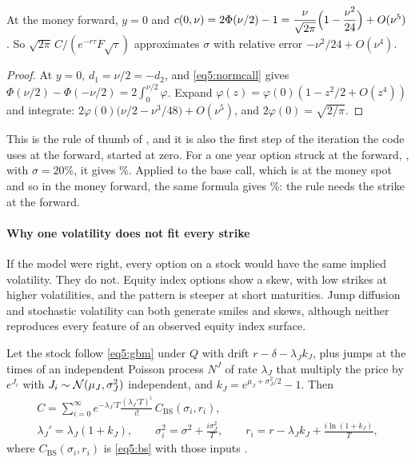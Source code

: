\begin{chapterrefs}
\begin{proposition}\label{prop5:bsapprox}
At the money forward, $y=0$ and $c(0,\nu)=2\Phi(\nu/2)-1=\dfrac{\nu}{\sqrt{2\pi}}\Bigl(1-\dfrac{\nu^2}{24}\Bigr)+O(\nu^5)$.
So $\sqrt{2\pi}\,C/(e^{-r\tau}F\sqrt\tau)$ approximates $\sigma$ with relative error $-\nu^2/24+O(\nu^4)$.
\end{proposition}

\begin{proof}
At $y=0$, $d_1=\nu/2=-d_2$, and \cref{eq5:normcall} gives $\Phi(\nu/2)-\Phi(-\nu/2)=2\int_0^{\nu/2}\varphi$. Expand
$\varphi(z)=\varphi(0)(1-z^2/2+O(z^4))$ and integrate: $2\varphi(0)\bigl(\nu/2-\nu^3/48\bigr)+O(\nu^5)$, and
$2\varphi(0)=\sqrt{2/\pi}$.
\end{proof}

This is the rule of thumb of \textcite{brenner1988}, and it is also the first step of the iteration the code uses at the forward, started at
zero.
For a one year option struck at the forward, \bsApproxStrike, with $\sigma=20\%$, it gives \bsApprox\%.
Applied to the base call, which is at the money spot and so in the money forward, the same formula
gives \bsApproxSpot\%: the rule needs the strike at the forward.

\paragraph{Why one volatility does not fit every strike}
If the model were right, every option on a stock would have the same implied volatility. They do not.
Equity index options show a skew, with low strikes at higher volatilities, and the pattern is
steeper at short maturities. Jump diffusion and stochastic volatility can both generate smiles and
skews, although neither reproduces every feature of an observed equity index surface.

\begin{proposition}\label{prop5:merton}
Let the stock follow \cref{eq5:gbm} under $Q$ with drift $r-\delta-\lambda_Jk_J$, plus jumps at the times of an
independent Poisson process $N^J$ of rate $\lambda_J$ that multiply the price by $e^{J_i}$ with
$J_i\sim\mathcal{N}(\mu_J,\sigma_J^2)$ independent, and $k_J=e^{\mu_J+\sigma_J^2/2}-1$. Then
\begin{equation*}
\begin{gathered}
  C=\sum_{i=0}^\infty e^{-\lambda_J'T}\frac{(\lambda_J'T)^i}{i!}\,C_{\mathrm{BS}}(\sigma_i,r_i),\\
  \lambda_J'=\lambda_J(1+k_J),\qquad\sigma_i^2=\sigma^2+\frac{i\sigma_J^2}T,\qquad r_i=r-\lambda_Jk_J+\frac{i\ln(1+k_J)}T,
\end{gathered}
\end{equation*}
where $C_{\mathrm{BS}}(\sigma_i,r_i)$ is \cref{eq5:bs} with those inputs \parencite{merton1976}.
\end{proposition}


\end{chapterrefs}
